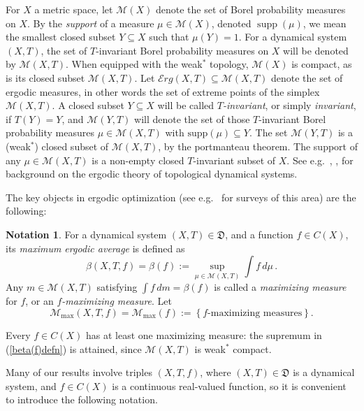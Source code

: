 \documentclass[reqno,11pt]{amsart}
\theoremstyle{definition}
\newtheorem{notation}[thm]{Notation}
\theoremstyle{remark}
\theoremstyle{remark}
\def\m{\mathcal M}
\def\e{\mathcal{E}rg}
\newcommand{\supp}{\operatorname{supp}}
\def\D{\mathfrak{D}}
\numberwithin{equation}{section}
\begin{document}
For $X$ a metric space, let $\m(X)$ denote the set of Borel probability measures on $X$.
By the \emph{support} of a measure $\mu\in\m(X)$, denoted $\supp(\mu)$, we mean the smallest closed subset $Y\subseteq X$
such that $\mu(Y)=1$.
For a dynamical system $(X,T)$,
 the set of $T$-invariant Borel probability measures on $X$
will be denoted by $\m(X,T)$.
When equipped with the weak$^*$ topology, $\m(X)$ is compact,
as is its closed subset $\m(X,T)$.
Let $\e(X,T) \subseteq \m(X,T)$ denote the set of ergodic measures, in other words the set of extreme points of the simplex $\m(X,T)$.
A closed subset $Y\subseteq X$ will be called \emph{$T$-invariant}, or simply \emph{invariant}, if $T(Y)=Y$, and 
$\m(Y,T)$
will denote the set of those $T$-invariant Borel probability measures $\mu\in\m(X,T)$ with $\text{supp}(\mu)\subseteq Y$.
The set $\m(Y,T)$ is a (weak$^*$) closed subset of $\m(X,T)$, by the portmanteau theorem.
The support of any $\mu\in\m(X,T)$
is a non-empty closed $T$-invariant subset of $X$.
See e.g.~\cite[Ch.~3]{furstenberg}, \cite[Ch.~4]{glasner}, \cite[Ch.~6]{waltersbook}
for background on the ergodic theory of topological dynamical systems.



The key objects in ergodic optimization 
(see e.g.~ \cite{Boc18, Jen19} for surveys of this area)
are the following:

\begin{notation}
For a dynamical system $(X,T)\in\D$, and a function $f\in C(X)$, its 
\emph{maximum ergodic average} is defined
as
\begin{equation}\label{beta(f)defn}
\beta(X,T,f)=\beta(f):=\sup_{\mu\in\m(X,T)} \int f\, d\mu\,.
\end{equation}
Any $m\in \m(X,T)$ satisfying $\int f\, dm=\beta(f)$
is called a \emph{maximizing measure} for $f$, or an \emph{$f$-maximizing measure}.
Let 
\begin{equation}\label{mxtfdefn}
\m_{\max}(X,T,f)=\m_{\max}(f) := \left\{ \text{$f$-maximizing measures} \right\}.
\end{equation}
\end{notation}

Every $f\in C(X)$ has at least one maximizing measure:
the supremum in (\ref{beta(f)defn}) is attained, since $\m(X,T)$ is weak$^*$ compact.


Many of our results involve triples $(X,T,f)$, where $(X,T)\in\D$ is a dynamical system, and $f\in C(X)$ is a continuous real-valued function, so it is convenient to introduce the following notation.
\end{document}

